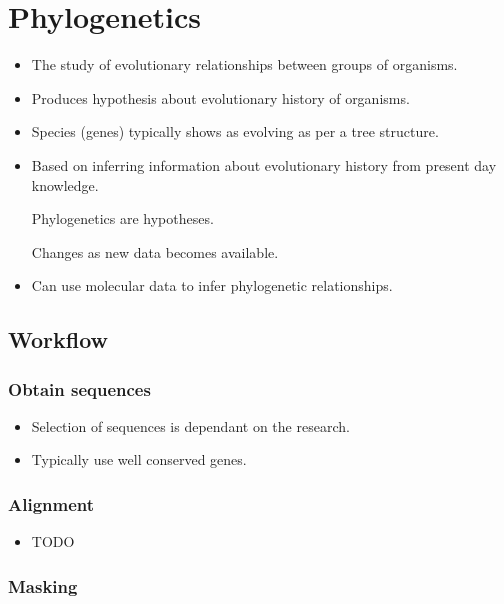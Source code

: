 \documentclass[a4paper]{article}
\begin{document}
\section{Phylogenetics}

\begin{itemize}
  \item
    The study of evolutionary relationships between groups of organisms.

  \item
    Produces hypothesis about evolutionary history of organisms.

  \item
    Species (genes) typically shows as evolving as per a tree structure.

  \item
    Based on inferring information about evolutionary history from present day
    knowledge.

    Phylogenetics are hypotheses.

    Changes as new data becomes available.

  \item
    Can use molecular data to infer phylogenetic relationships.
\end{itemize}

\subsection{Workflow}

\subsubsection{Obtain sequences}

\begin{itemize}
  \item
    Selection of sequences is dependant on the research.

  \item
    Typically use well conserved genes.
\end{itemize}

\subsubsection{Alignment}

\begin{itemize}
  \item
    TODO
\end{itemize}

\subsubsection{Masking}
\end{document}
